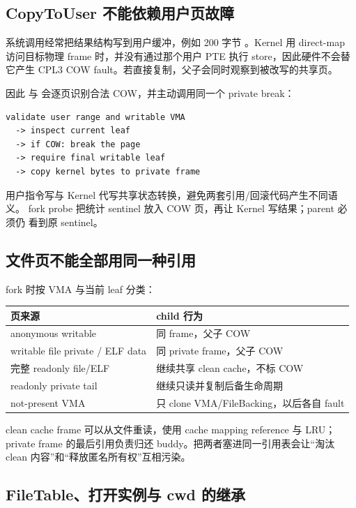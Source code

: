 \subsection{CopyToUser 不能依赖用户页故障}

系统调用经常把结果结构写到用户缓冲，例如 200 字节
。Kernel 用 direct-map 访问目标物理 frame
时，并没有通过那个用户 PTE 执行 store，因此硬件不会替它产生 CPL3 COW
fault。若直接复制，父子会同时观察到被改写的共享页。

因此  与 
会逐页识别合法 COW，并主动调用同一个 private break：

\begin{lstlisting}
validate user range and writable VMA
  -> inspect current leaf
  -> if COW: break the page
  -> require final writable leaf
  -> copy kernel bytes to private frame
\end{lstlisting}

用户指令写与 Kernel 代写共享状态转换，避免两套引用/回滚代码产生不同语义。
fork probe 把统计 sentinel 放入 COW 页，再让 Kernel 写结果；parent 必须仍
看到原 sentinel。

\subsection{文件页不能全部用同一种引用}

fork 时按 VMA 与当前 leaf 分类：

\begin{longtable}{L{0.32\textwidth}L{0.43\textwidth}}
\toprule
\textbf{页来源} & \textbf{child 行为}\\
\midrule
anonymous writable & 同 frame，父子 COW\\
writable file private / ELF data & 同 private frame，父子 COW\\
完整 readonly file/ELF & 继续共享 clean cache，不标 COW\\
readonly private tail & 继续只读并复制后备生命周期\\
not-present VMA & 只 clone VMA/FileBacking，以后各自 fault\\
\bottomrule
\end{longtable}

clean cache frame 可以从文件重读，使用 cache mapping reference 与 LRU；
private frame 的最后引用负责归还 buddy。把两者塞进同一引用表会让“淘汰 clean
内容”和“释放匿名所有权”互相污染。

\subsection{FileTable、打开实例与 cwd 的继承}


